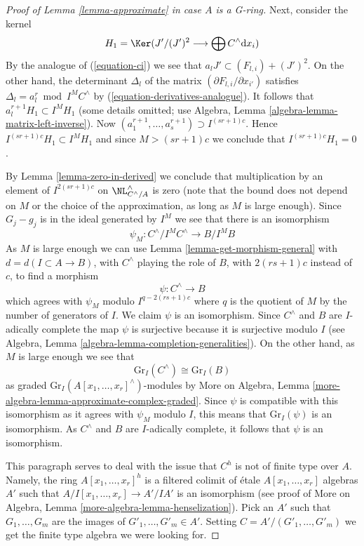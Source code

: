 \begin{proof}[Proof of Lemma \ref{lemma-approximate} in case $A$ is a G-ring]
\medskip\noindent
Next, consider the kernel
$$
H_1 = \Ker(J'/(J')^2 \longrightarrow \bigoplus C^\wedge \text{d}x_i)
$$
By the analogue of (\ref{equation-ci}) we see that
$a_l J' \subset (F_{l, i}) + (J')^2$. On the other hand, the
determinant $\Delta_l$ of the matrix $(\partial F_{l, i}/ \partial x_{i'})$
satisfies $\Delta_l = a_l^r \bmod I^M C^\wedge$ by
(\ref{equation-derivatives-analogue}). It follows that
$a_l^{r + 1} H_1 \subset I^M H_1$ (some details omitted; use
Algebra, Lemma \ref{algebra-lemma-matrix-left-inverse}).
Now $(a_1^{r + 1}, \ldots, a_s^{r + 1}) \supset I^{(sr + 1)c}$.
Hence $I^{(sr + 1)c}H_1 \subset I^M H_1$ and since $M > (sr + 1)c$
we conclude that $I^{(sr + 1)c}H_1 = 0$.

\medskip\noindent
By Lemma \ref{lemma-zero-in-derived}
we conclude that multiplication by an element
of $I^{2(sr + 1)c}$ on $\NL^\wedge_{C^\wedge/A}$ is zero
(note that the bound does not depend on $M$ or the choice
of the approximation, as long as $M$ is large enough).
Since $G_j - g_j$ is in the ideal generated by $I^M$
we see that there is an isomorphism
$$
\psi_M : C^\wedge/I^MC^\wedge \to B/I^MB
$$
As $M$ is large enough we can use
Lemma \ref{lemma-get-morphism-general}
with $d = d(I \subset A \to B)$,
with $C^\wedge$ playing the role of $B$,
with $2(rs + 1)c$ instead of $c$,
to find a morphism
$$
\psi : C^\wedge \longrightarrow B
$$
which agrees with $\psi_M$ modulo $I^{q - 2(rs + 1)c}$ where
$q$ is the quotient of $M$ by the number of generators of $I$.
We claim $\psi$ is an isomorphism. Since $C^\wedge$ and $B$
are $I$-adically complete the map $\psi$ is surjective
because it is surjective modulo $I$ (see
Algebra, Lemma \ref{algebra-lemma-completion-generalities}).
On the other hand, as $M$ is large enough we see that
$$
\text{Gr}_I(C^\wedge) \cong \text{Gr}_I(B)
$$
as graded $\text{Gr}_I(A[x_1, \ldots, x_r]^\wedge)$-modules
by More on Algebra, Lemma \ref{more-algebra-lemma-approximate-complex-graded}.
Since $\psi$ is compatible with this isomorphism as it
agrees with $\psi_M$ modulo $I$, this means that $\text{Gr}_I(\psi)$ is an
isomorphism. As $C^\wedge$ and $B$ are
$I$-adically complete, it follows that $\psi$ is an isomorphism.

\medskip\noindent
This paragraph serves to deal with the issue that $C^h$
is not of finite type over $A$. Namely, the ring
$A[x_1, \ldots, x_r]^h$ is a filtered colimit of
\'etale $A[x_1, \ldots, x_r]$ algebras $A'$ such that
$A/I[x_1, \ldots, x_r] \to A'/IA'$ is an isomorphism
(see proof of More on Algebra, Lemma \ref{more-algebra-lemma-henselization}).
Pick an $A'$ such that $G_1, \ldots, G_m$ are the
images of $G'_1, \ldots, G'_m \in A'$.
Setting $C = A'/(G'_1, \ldots, G'_m)$ we get the finite
type algebra we were looking for.
\end{proof}

